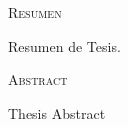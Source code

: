 
\cleardoublepage
\thispagestyle{plain}
{}
\begin{center}
    \vspace*{\fill}
    {\Huge{\textsc{Resumen}}}\\[1cm]

    \begin{minipage}{0.7\textwidth}
        Resumen de Tesis.
    \end{minipage}

    \vspace*{\fill}

\end{center}



\cleardoublepage
\thispagestyle{plain}
{}
\begin{center}
    \vspace*{\fill}
    {\Huge{\textsc{Abstract}}}\\[1cm]

    \begin{minipage}{0.7\textwidth}
        Thesis Abstract
    \end{minipage}

    \vspace*{\fill}

\end{center}
